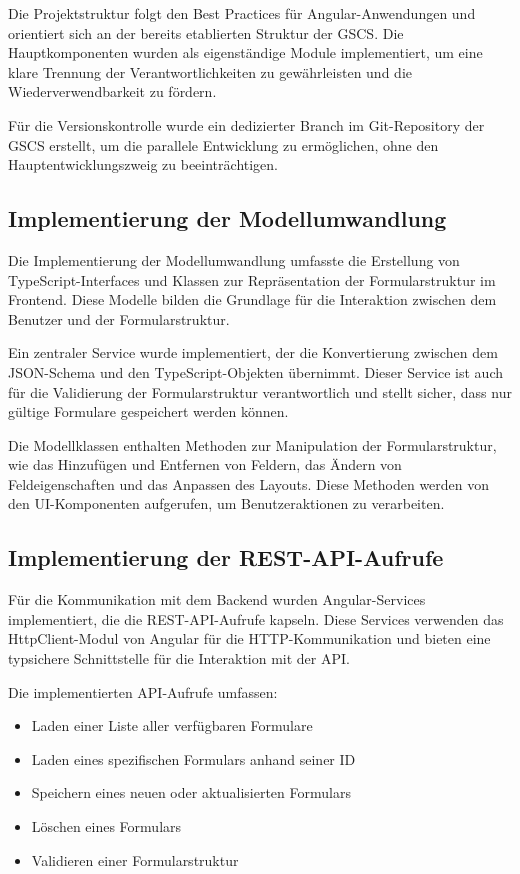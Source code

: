 \documentclass[a4paper,11pt]{article}
\begin{document}
Die Projektstruktur folgt den Best Practices für Angular-Anwendungen und orientiert sich an der bereits etablierten Struktur der GSCS. Die Hauptkomponenten wurden als eigenständige Module implementiert, um eine klare Trennung der Verantwortlichkeiten zu gewährleisten und die Wiederverwendbarkeit zu fördern.

Für die Versionskontrolle wurde ein dedizierter Branch im Git-Repository der GSCS erstellt, um die parallele Entwicklung zu ermöglichen, ohne den Hauptentwicklungszweig zu beeinträchtigen.

\subsection{Implementierung der Modellumwandlung}
Die Implementierung der Modellumwandlung umfasste die Erstellung von TypeScript-Interfaces und Klassen zur Repräsentation der Formularstruktur im Frontend. Diese Modelle bilden die Grundlage für die Interaktion zwischen dem Benutzer und der Formularstruktur.

Ein zentraler Service wurde implementiert, der die Konvertierung zwischen dem JSON-Schema und den TypeScript-Objekten übernimmt. Dieser Service ist auch für die Validierung der Formularstruktur verantwortlich und stellt sicher, dass nur gültige Formulare gespeichert werden können.

Die Modellklassen enthalten Methoden zur Manipulation der Formularstruktur, wie das Hinzufügen und Entfernen von Feldern, das Ändern von Feldeigenschaften und das Anpassen des Layouts. Diese Methoden werden von den UI-Komponenten aufgerufen, um Benutzeraktionen zu verarbeiten.

\subsection{Implementierung der REST-API-Aufrufe}
Für die Kommunikation mit dem Backend wurden Angular-Services implementiert, die die REST-API-Aufrufe kapseln. Diese Services verwenden das HttpClient-Modul von Angular für die HTTP-Kommunikation und bieten eine typsichere Schnittstelle für die Interaktion mit der API.

Die implementierten API-Aufrufe umfassen:
\begin{itemize}
  \item Laden einer Liste aller verfügbaren Formulare
  \item Laden eines spezifischen Formulars anhand seiner ID
  \item Speichern eines neuen oder aktualisierten Formulars
  \item Löschen eines Formulars
  \item Validieren einer Formularstruktur
\end{itemize}
\end{document}
